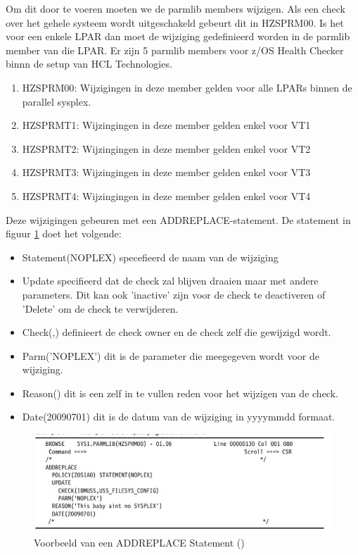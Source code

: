 Om dit door te voeren moeten we de parmlib members wijzigen. Als een check over het gehele systeem wordt uitgeschakeld gebeurt dit in HZSPRM00. Is het voor een enkele LPAR dan moet de wijziging gedefinieerd worden in de parmlib member van die LPAR. Er zijn 5 parmlib members voor z/OS Health Checker binnn de setup van HCL Technologies.

\begin{enumerate}
	\item HZSPRM00: Wijzigingen in deze member gelden voor alle LPARs binnen de parallel sysplex.
	\item HZSPRMT1: Wijzingingen in deze member gelden enkel voor VT1
	\item HZSPRMT2: Wijzingingen in deze member gelden enkel voor VT2
	\item HZSPRMT3: Wijzingingen in deze member gelden enkel voor VT3
	\item HZSPRMT4: Wijzingingen in deze member gelden enkel voor VT4
\end{enumerate}

Deze wijzigingen gebeuren met een ADDREPLACE-statement. De statement in figuur \ref{fig:addreplace} doet het volgende:

\begin{itemize}
	\item Statement(NOPLEX) specefieerd de naam van de wijziging
	\item Update specifieerd dat de check zal blijven draaien maar met andere parameters. Dit kan ook 'inactive' zijn voor de check te deactiveren of 'Delete' om de check te verwijderen.
	\item Check(,) definieert de check owner en de check zelf die gewijzigd wordt.
	\item Parm('NOPLEX') dit is de parameter die meegegeven wordt voor de wijziging.
	\item Reason() dit is een zelf in te vullen reden voor het wijzigen van de check.
	\item Date(20090701) dit is de datum van de wijziging in yyyymmdd formaat. \cite{Bezzi2010}
\end{itemize}

\begin{figure}[h]
	\centering
	\includegraphics{img/addreplace}
	\caption[ADDREPLACE statement]{Voorbeeld van een ADDREPLACE Statement (\cite{IBMCorporation2019})}
	\label{fig:addreplace}
\end{figure}

